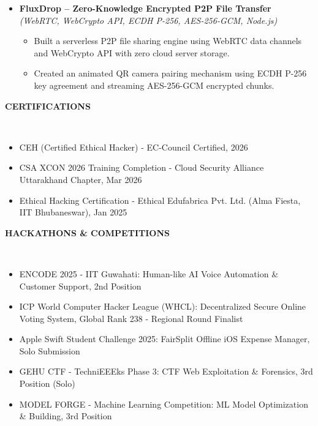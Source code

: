 \documentclass[a4paper,10pt]{article}
\newcommand{\isep}{-2 pt}
\newcommand{\lsep}{-0.5cm}
\newcommand{\resheading}[1]{{\small \colorbox{mygrey}{\begin{minipage}{6.62in}{\textbf{#1 \vphantom{p\^{E}}}}\end{minipage}}}}
\begin{document}
\begin{itemize}
\item \textbf{FluxDrop -- Zero-Knowledge Encrypted P2P File Transfer} \\
 \emph{(WebRTC, WebCrypto API, ECDH P-256, AES-256-GCM, Node.js)} \\[-0.6cm]
	\begin{itemize}\itemsep \isep
	\item Built a serverless P2P file sharing engine using WebRTC data channels and WebCrypto API with zero cloud server storage.
	\item Created an animated QR camera pairing mechanism using ECDH P-256 key agreement and streaming AES-256-GCM encrypted chunks.
	\end{itemize}
\end{itemize}

\resheading{\textbf{CERTIFICATIONS} }\\[\lsep]
\begin{itemize}
\item \noindent CEH (Certified Ethical Hacker) - EC-Council Certified, 2026
\item \noindent CSA XCON 2026 Training Completion - Cloud Security Alliance Uttarakhand Chapter, Mar 2026
\item \noindent Ethical Hacking Certification - Ethical Edufabrica Pvt. Ltd. (Alma Fiesta, IIT Bhubaneswar), Jan 2025
\end{itemize}

\resheading{\textbf{HACKATHONS \& COMPETITIONS} }\\[\lsep]
\begin{itemize}
\item \noindent ENCODE 2025 - IIT Guwahati: Human-like AI Voice Automation \& Customer Support, 2nd Position
\item \noindent ICP World Computer Hacker League (WHCL): Decentralized Secure Online Voting System, Global Rank 238 - Regional Round Finalist
\item \noindent Apple Swift Student Challenge 2025: FairSplit Offline iOS Expense Manager, Solo Submission
\item \noindent GEHU CTF - TechniEEEks Phase 3: CTF Web Exploitation \& Forensics, 3rd Position (Solo)
\item \noindent MODEL FORGE - Machine Learning Competition: ML Model Optimization \& Building, 3rd Position
\end{itemize}
\end{document}
